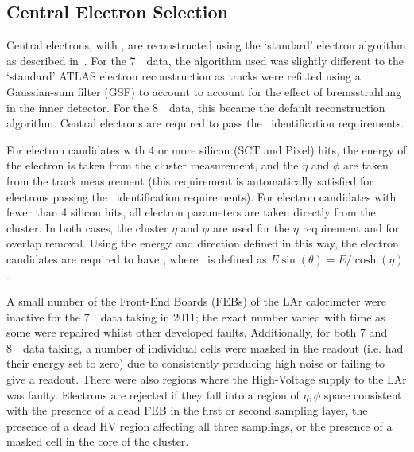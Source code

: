 \subsection{Central Electron Selection}

Central electrons, with , are reconstructed using the
`standard' electron algorithm as described in~.  For the 7~\tev\
data, the algorithm used was slightly different to the `standard' ATLAS electron
reconstruction as tracks were refitted using a Gaussian-sum filter (GSF) to
account to account for the effect of bremsstrahlung in the inner detector. For
the 8~\tev\ data, this became the default reconstruction algorithm. Central electrons
are required to pass the \loosePP\ identification requirements.

For electron candidates with 4 or more silicon (SCT and Pixel) hits, the energy
of the electron is taken from the cluster measurement, and the $\eta$ and $\phi$
are taken from the track measurement (this requirement is automatically
satisfied for electrons passing the \loosePP\ identification requirements). For
electron candidates with fewer than 4 silicon hits, all electron parameters are
taken directly from the cluster. In both cases, the cluster $\eta$ and $\phi$
are used for the $\eta$ requirement and for overlap removal. Using the energy
and direction defined in this way, the electron candidates are required to have
\etgt{7}, where \et\ is defined as $E\sin(\theta)=E/\cosh(\eta)$. 

A small number of the Front-End Boards (FEBs) of the LAr calorimeter were
inactive for the 7~\tev\ data taking in 2011; the exact number varied with time as some were
repaired whilst other developed faults. Additionally, for both 7 and 8~\tev\ data taking, a number of individual
cells were masked in the readout (i.e. had their energy set to zero) due to
consistently producing high noise or failing to give a readout. There were also
regions where the High-Voltage supply to the LAr was faulty. Electrons are
rejected if they fall into a region of $\eta, \phi$ space consistent with the
presence of a dead FEB in the first or second sampling layer, the
presence of a dead HV region affecting all three samplings, or the presence of a
masked cell in the core of the cluster.

